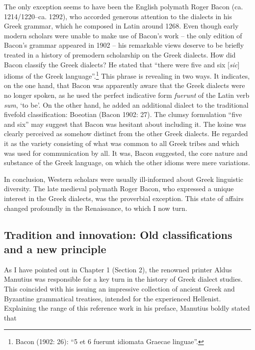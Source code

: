 \begin{styleStandard}
The only exception seems to have been the English polymath Roger Bacon (ca. 1214/1220–ca. 1292), who accorded generous attention to the dialects in his Greek grammar, which he composed in Latin around 1268. Even though early modern scholars were unable to make use of Bacon’s work – the only edition of Bacon’s grammar appeared in 1902 – his remarkable views deserve to be briefly treated in a history of premodern scholarship on the Greek dialects. How did Bacon classify the Greek dialects? He stated that “there were five and six [\textit{sic}] idioms of the Greek language”.\footnote{ Bacon (1902: 26): “5 et 6 fuerunt idiomata Graecae linguae”.} This phrase is revealing in two ways. It indicates, on the one hand, that Bacon was apparently aware that the Greek dialects were no longer spoken, as he used the perfect indicative form \textit{fuerunt} of the Latin verb \textit{sum}, ‘to be’. On the other hand, he added an additional dialect to the traditional fivefold classification: Boeotian (Bacon 1902: 27). The clumsy formulation “five and six” may suggest that Bacon was hesitant about including it. The koine was clearly perceived as somehow distinct from the other Greek dialects. He regarded it as the variety consisting of what was common to all Greek tribes and which was used for communication by all. It was, Bacon suggested, the core nature and substance of the Greek language, on which the other idioms were mere variations.
\end{styleStandard}

\begin{styleStandard}
In conclusion, Western scholars were usually ill-informed about Greek linguistic diversity. The late medieval polymath Roger Bacon, who expressed a unique interest in the Greek dialects, was the proverbial exception. This state of affairs changed profoundly in the Renaissance, to which I now turn.
\end{styleStandard}

\subsection{Tradition and innovation: Old classifications and a new principle}
\hypertarget{Toc19704812}{}\begin{styleStandard}
As I have pointed out in Chapter 1 (Section 2), the renowned printer Aldus Manutius was responsible for a key turn in the history of Greek dialect studies. This coincided with his issuing an impressive collection of ancient Greek and Byzantine grammatical treatises, intended for the experienced Hellenist. Explaining the range of this reference work in his preface, Manutius boldly stated that
\end{styleStandard}

